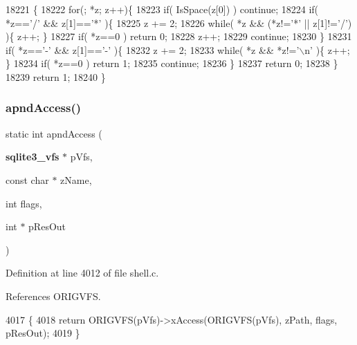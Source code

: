 \begin{DoxyCode}
18221                                          \{
18222   \textcolor{keywordflow}{for}(; *z; z++)\{
18223     \textcolor{keywordflow}{if}( IsSpace(z[0]) ) \textcolor{keywordflow}{continue};
18224     \textcolor{keywordflow}{if}( *z==\textcolor{charliteral}{'/'} && z[1]==\textcolor{charliteral}{'*'} )\{
18225       z += 2;
18226       \textcolor{keywordflow}{while}( *z && (*z!=\textcolor{charliteral}{'*'} || z[1]!=\textcolor{charliteral}{'/'}) )\{ z++; \}
18227       \textcolor{keywordflow}{if}( *z==0 ) \textcolor{keywordflow}{return} 0;
18228       z++;
18229       \textcolor{keywordflow}{continue};
18230     \}
18231     \textcolor{keywordflow}{if}( *z==\textcolor{charliteral}{'-'} && z[1]==\textcolor{charliteral}{'-'} )\{
18232       z += 2;
18233       \textcolor{keywordflow}{while}( *z && *z!=\textcolor{charliteral}{'\(\backslash\)n'} )\{ z++; \}
18234       \textcolor{keywordflow}{if}( *z==0 ) \textcolor{keywordflow}{return} 1;
18235       \textcolor{keywordflow}{continue};
18236     \}
18237     \textcolor{keywordflow}{return} 0;
18238   \}
18239   \textcolor{keywordflow}{return} 1;
18240 \}
\end{DoxyCode}
\mbox{\label{shell_8c_a3338671d422f070cd79f77bad4a558ea}} 
\subsubsection{apnd\+Access()}
{\footnotesize\ttfamily static int apnd\+Access (\begin{DoxyParamCaption}\item[{\textbf{ sqlite3\+\_\+vfs} $\ast$}]{p\+Vfs,  }\item[{const char $\ast$}]{z\+Name,  }\item[{int}]{flags,  }\item[{int $\ast$}]{p\+Res\+Out }\end{DoxyParamCaption})\hspace{0.3cm}{\ttfamily [static]}}



Definition at line 4012 of file shell.\+c.



References O\+R\+I\+G\+V\+FS.


\begin{DoxyCode}
4017  \{
4018   \textcolor{keywordflow}{return} ORIGVFS(pVfs)->xAccess(ORIGVFS(pVfs), zPath, flags, pResOut);
4019 \}
\end{DoxyCode}
\mbox{\label{shell_8c_ace03c3639add18c69f43010d57ec9153}} 
